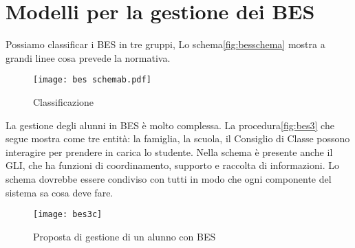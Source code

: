\chapter{Modelli per la  gestione dei BES}
\label{cha:ModellogestioneBES}
Possiamo classificar i BES in tre gruppi, Lo schema\vref{fig:besschema} mostra a grandi linee cosa prevede la normativa. 
 \begin{figure}[t]
 	\centering
 	\texttt{[image: bes schemab.pdf]}
 	\caption[Classificazione]{Classificazione}
 	\label{fig:besschema}
 \end{figure}
La gestione degli alunni in BES è molto complessa. La procedura\vref{fig:bes3} che segue mostra come tre entità: la famiglia, la scuola, il Consiglio di Classe possono interagire per prendere in carica lo studente. Nella schema è presente anche il GLI, che ha funzioni di coordinamento, supporto e raccolta di informazioni. Lo schema dovrebbe essere condiviso con tutti in modo che ogni componente del sistema sa cosa deve fare. 
\begin{figure}[t]
\centering
\texttt{[image: bes3c]}
\caption[Gestione BES]{Proposta di gestione di un alunno con BES}
\label{fig:bes3}
\end{figure}



